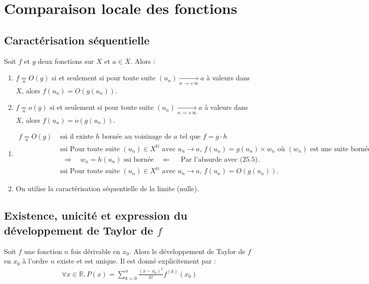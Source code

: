 \documentclass[../main.tex]{subfiles}
\begin{document}
\setcounter{chapter}{24}
\chapter{Comparaison locale des fonctions}
\tableofcontents
\clearpage

\section{Caractérisation séquentielle}
\begin{tcolorbox}[title=Théorème 25.6, title filled=false, colframe=orange, colback=orange!10!white]
    Soit $f$ et $g$ deux fonctions sur $X$ et $a\in \overline{X}$. Alors : 
    \begin{enumerate}
        \item $f \underset{a}{=} O(g)$ si et seulement si pour toute suite $(u_n) \underset{n \to +\infty}{\longrightarrow} a$ à valeurs dans $X$, alors $f(u_n) = O(g(u_n))$. 
        \item $f \underset{a}{=} o(g)$ si et seulement si pour toute suite $(u_n) \underset{n \to +\infty}{\longrightarrow} a$ à valeurs dans $X$, alors $f(u_n) = o(g(u_n))$.
    \end{enumerate}
\end{tcolorbox}

\begin{enumerate}
    \item \begin{align*}
        f \underset{a}{=} O(g) &\text{ ssi } \text{il existe $h$ bornée au voisinage de $a$ tel que } f = g \cdot h \\
        &\text{ ssi } \text{Pour toute suite $(u_n) \in X^{\mathbb{N}}$ avec $u_n\to a$, } f(u_n) = g(u_n) \times w_n \text{ où $(w_n)$ est une suite bornée. } \\
        &\text{ } \boxed{\Rightarrow} \quad w_n = h(u_n) \text{ ssi bornée} \quad \boxed{\Leftarrow} \quad \text{ Par l'absurde avec (25.5). } \\
        &\text{ ssi } \text{Pour toute suite $(u_n) \in X^{\mathbb{N}}$ avec $u_n\to a$, } f(u_n) = O(g(u_n)).
    \end{align*}
    \item On utilise la caractérisation séquentielle de la limite (nulle). 
\end{enumerate}

\section{Existence, unicité et expression du développement de Taylor de $f$}
\begin{tcolorbox}[title=Théorème 25.14, title filled=false, colframe=orange, colback=orange!10!white]
    Soit $f$ une fonction $n$ fois dérivable en $x_0$. Alors le développement de Taylor de $f$ en $x_0$ à l'ordre $n$ existe et est unique. Il est donné explicitement par :
    \begin{align*}
        \forall x\in \mathbb{R}, P(x) = \sum_{k=0}^{n} \frac{(x-x_0)^k}{k!} f^{(k)}(x_0)
    \end{align*}
\end{tcolorbox}
\end{document}
